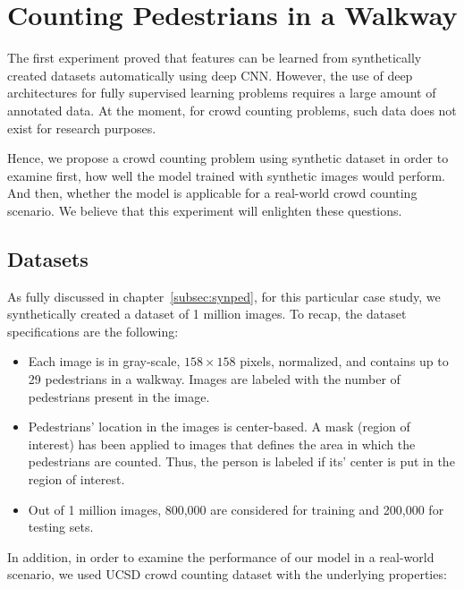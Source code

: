 \section{Counting Pedestrians in a Walkway}

The first experiment proved that features can be learned from synthetically created datasets automatically using deep CNN. However, the use of deep architectures for fully supervised learning problems requires a large amount of annotated data. At the moment, for crowd counting problems, such data does not exist for research purposes. 

Hence, we propose a crowd counting problem using synthetic dataset in order to examine first, how well the model trained with synthetic images would perform. And then, whether the model is applicable for a real-world crowd counting scenario. We believe that this experiment will enlighten these questions. 

\subsection{Datasets} 

As fully discussed in chapter~\ref{subsec:synped}, for this particular case study, we synthetically created a dataset of 1 million images. To recap, the dataset specifications are the following:
\begin{itemize}
\item Each image is in gray-scale, $158\times158$ pixels, normalized, and contains up to 29 pedestrians in a walkway. Images are labeled with the number of pedestrians present in the image.  
\item Pedestrians' location in the images is center-based. A mask (region of interest) has been applied to images that defines the area in which the pedestrians are counted. Thus, the person is labeled if its' center is put in the region of interest.   
\item Out of 1 million images, 800,000 are considered for training and 200,000 for testing sets.
\end{itemize} 

\noindent In addition, in order to examine the performance of our model in a real-world scenario, we used UCSD crowd counting dataset \cite{chan2008privacy} with the underlying properties:

